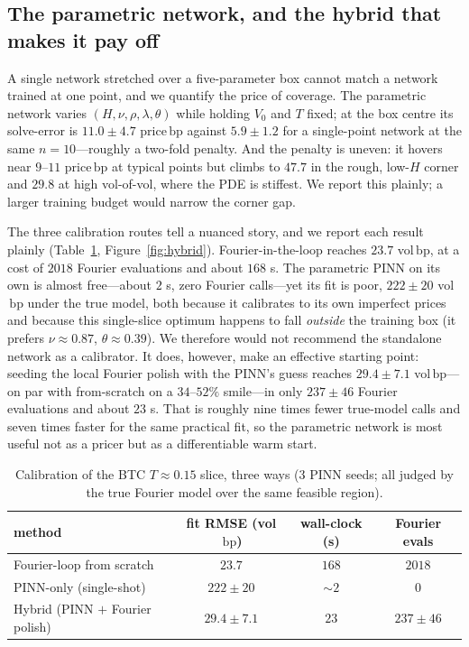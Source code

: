 \documentclass[11pt]{article}
\newcommand{\bp}{\ensuremath{\,\mathrm{bp}}}
\begin{document}
\subsection{The parametric network, and the hybrid that makes it pay off}
\label{sec:hybrid}
A single network stretched over a five-parameter box cannot match a network
trained at one point, and we quantify the price of coverage. The parametric
network varies $(H,\nu,\rho,\lambda,\theta)$ while holding $V_0$ and $T$ fixed; at
the box centre its solve-error is $11.0\pm4.7$ price\bp{} against $5.9\pm1.2$ for a
single-point network at the same $n=10$---roughly a two-fold penalty. And the
penalty is uneven: it hovers near $9$--$11$ price\bp{} at typical points but
climbs to $47.7$ in the rough, low-$H$ corner and $29.8$ at high vol-of-vol, where
the PDE is stiffest. We report this plainly; a larger training budget would narrow
the corner gap.

The three calibration routes tell a nuanced story, and we report each result
plainly (Table~\ref{tab:calib}, Figure~\ref{fig:hybrid}). Fourier-in-the-loop
reaches $23.7$ vol\bp{}, at a cost of $2018$ Fourier evaluations and about
$168$ s. The parametric PINN on its own is almost free---about $2$ s, zero
Fourier calls---yet its fit is poor, $222\pm20$ vol\bp{} under the true model,
both because it calibrates to its own imperfect prices and because this
single-slice optimum happens to fall \emph{outside} the training box (it prefers
$\nu\approx0.87$, $\theta\approx0.39$). We therefore would not recommend the
standalone network as a calibrator. It does, however, make an effective starting
point: seeding the local Fourier polish with the PINN's guess reaches
$29.4\pm7.1$ vol\bp{}---on par with from-scratch on a $34$--$52\%$ smile---in only
$237\pm46$ Fourier evaluations and about $23$ s. That is roughly nine times fewer
true-model calls and seven times faster for the same practical fit, so the
parametric network is most useful not as a pricer but as a differentiable warm
start.

\begin{table}[t]\centering
\caption{Calibration of the BTC $T\approx0.15$ slice, three ways (3 PINN seeds;
all judged by the true Fourier model over the same feasible region).}
\label{tab:calib}
\begin{tabular}{lccc}
\toprule
method & fit RMSE (vol\bp) & wall-clock (s) & Fourier evals\\
\midrule
Fourier-loop from scratch      & $23.7$        & $168$ & $2018$\\
PINN-only (single-shot)        & $222\pm20$    & $\sim2$ & $0$\\
Hybrid (PINN $+$ Fourier polish) & $29.4\pm7.1$ & $23$  & $237\pm46$\\
\bottomrule
\end{tabular}
\end{table}
\end{document}

